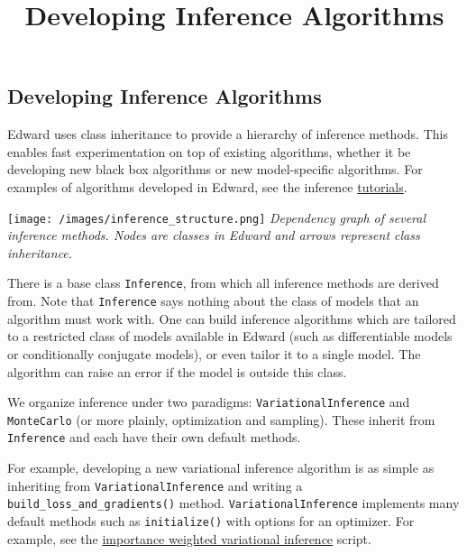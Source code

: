 \title{Developing Inference Algorithms}

\subsection{Developing Inference Algorithms}

Edward uses class inheritance to provide a hierarchy of inference
methods. This enables fast experimentation on top of existing
algorithms, whether it be developing new black box algorithms or
new model-specific algorithms.
For examples of algorithms developed in Edward, see the inference
\href{/tutorials/}{tutorials}.

\texttt{[image: /images/inference\_structure.png]}
{\small\textit{Dependency graph of several inference methods.
Nodes are classes in Edward and arrows represent class inheritance.}}

There is a base class \texttt{Inference}, from which all inference
methods are derived from. Note that \texttt{Inference} says nothing
about the class of models that an algorithm must work with. One can
build inference algorithms which are tailored to a restricted class of
models available in Edward (such as differentiable models or
conditionally conjugate models), or even tailor it to a single model.
The algorithm can raise an error if the model is outside this class.

We organize inference under two paradigms:
\texttt{VariationalInference} and \texttt{MonteCarlo} (or more plainly,
optimization and sampling). These inherit from \texttt{Inference} and each
have their own default methods.

For example, developing a new variational inference algorithm is as simple as
inheriting from \texttt{VariationalInference} and writing a
\texttt{build_loss_and_gradients()} method. \texttt{VariationalInference} implements many default methods such
as \texttt{initialize()} with options for an optimizer.
For example, see the
\href{https://github.com/blei-lab/edward/blob/master/examples/iwvi.py}{importance
weighted variational inference} script.
